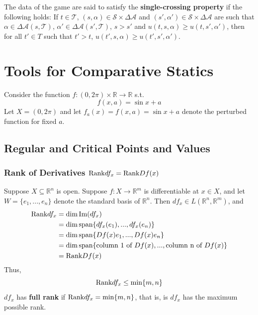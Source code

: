 \documentclass[11pt]{elegantbook}
\begin{document}
\begin{definition}
    \normalfont
    The data of the game are said to satisfy the \textbf{single-crossing property} if the following holds: If $t\in \mathcal{T}$, $(s,\alpha)\in \mathcal{S}\times \Delta\mathcal{A}$ and $(s',\alpha')\in \mathcal{S}\times \Delta\mathcal{A}$ are such that $\alpha\in \Delta\mathcal{A}(s,\mathcal{T})$, $\alpha'\in \Delta\mathcal{A}(s',\mathcal{T})$, $s>s'$ and $u(t,s,\alpha)\geq u(t,s',\alpha')$, then for all $t'\in T$ such that $t'>t$, $u(t',s,\alpha)\geq u(t',s',\alpha')$.
\end{definition}




\chapter{Tools for Comparative Statics}
Consider the function $f:(0,2\pi) \times \mathbb{R} \rightarrow \mathbb{R}$ s.t. $$f(x,a)=\sin x+a$$
Let $X=(0,2\pi)$ and let $f_a(x) = f(x, a) = \sin x + a$ denote the perturbed function for fixed $a$.



\section{Regular and Critical Points and Values}
\subsection{Rank of Derivatives $\textnormal{Rank} df_x=\textnormal{Rank} Df(x)$}
Suppose $X \subseteq \mathbb{R}^n$ is open. Suppose $f : X \rightarrow \mathbb{R}^m$ is differentiable at $x \in X$, and let $W = \{e_1, . . . , e_n\}$ denote the standard basis of $\mathbb{R}^n$. Then $df_x \in L(\mathbb{R}^n, \mathbb{R}^m)$, and
\begin{equation}
    \begin{aligned}
        \textnormal{Rank} df_x &= \dim \textnormal{Im}(df_x)\\
        &= \dim \textnormal{span}\{df_x(e_1), . . . , df_x(e_n)\}\\
        &= \dim \textnormal{span}\{Df(x)e_1, . . . , Df(x)e_n\}\\
        &= \dim \textnormal{span}\{\textnormal{column 1 of }Df(x), . . . , \textnormal{column n of }Df(x)\}\\
        &=\textnormal{Rank} Df(x)
    \end{aligned}
    \nonumber
\end{equation}
Thus,
$$\textnormal{Rank} df_x\leq\min\{m,n\}$$
$df_x$ has \textbf{full rank} if $\textnormal{Rank} df_x=\min\{m,n\}$, that is, is $df_x$ has the maximum possible rank.
\end{document}
